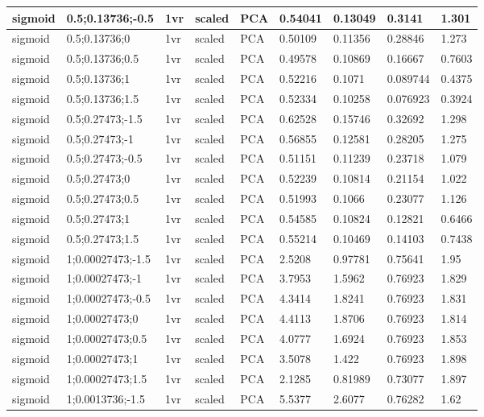 \begin{longtable}{lllllllll}
sigmoid & 0.5;0.13736;-0.5 & 1vr & scaled & PCA & 0.54041 & 0.13049 & 0.3141 & 1.301\\ \hline
sigmoid & 0.5;0.13736;0 & 1vr & scaled & PCA & 0.50109 & 0.11356 & 0.28846 & 1.273\\ \hline
sigmoid & 0.5;0.13736;0.5 & 1vr & scaled & PCA & 0.49578 & 0.10869 & 0.16667 & 0.7603\\ \hline
sigmoid & 0.5;0.13736;1 & 1vr & scaled & PCA & 0.52216 & 0.1071 & 0.089744 & 0.4375\\ \hline
sigmoid & 0.5;0.13736;1.5 & 1vr & scaled & PCA & 0.52334 & 0.10258 & 0.076923 & 0.3924\\ \hline
sigmoid & 0.5;0.27473;-1.5 & 1vr & scaled & PCA & 0.62528 & 0.15746 & 0.32692 & 1.298\\ \hline
sigmoid & 0.5;0.27473;-1 & 1vr & scaled & PCA & 0.56855 & 0.12581 & 0.28205 & 1.275\\ \hline
sigmoid & 0.5;0.27473;-0.5 & 1vr & scaled & PCA & 0.51151 & 0.11239 & 0.23718 & 1.079\\ \hline
sigmoid & 0.5;0.27473;0 & 1vr & scaled & PCA & 0.52239 & 0.10814 & 0.21154 & 1.022\\ \hline
sigmoid & 0.5;0.27473;0.5 & 1vr & scaled & PCA & 0.51993 & 0.1066 & 0.23077 & 1.126\\ \hline
sigmoid & 0.5;0.27473;1 & 1vr & scaled & PCA & 0.54585 & 0.10824 & 0.12821 & 0.6466\\ \hline
sigmoid & 0.5;0.27473;1.5 & 1vr & scaled & PCA & 0.55214 & 0.10469 & 0.14103 & 0.7438\\ \hline
sigmoid & 1;0.00027473;-1.5 & 1vr & scaled & PCA & 2.5208 & 0.97781 & 0.75641 & 1.95\\ \hline
sigmoid & 1;0.00027473;-1 & 1vr & scaled & PCA & 3.7953 & 1.5962 & 0.76923 & 1.829\\ \hline
sigmoid & 1;0.00027473;-0.5 & 1vr & scaled & PCA & 4.3414 & 1.8241 & 0.76923 & 1.831\\ \hline
sigmoid & 1;0.00027473;0 & 1vr & scaled & PCA & 4.4113 & 1.8706 & 0.76923 & 1.814\\ \hline
sigmoid & 1;0.00027473;0.5 & 1vr & scaled & PCA & 4.0777 & 1.6924 & 0.76923 & 1.853\\ \hline
sigmoid & 1;0.00027473;1 & 1vr & scaled & PCA & 3.5078 & 1.422 & 0.76923 & 1.898\\ \hline
sigmoid & 1;0.00027473;1.5 & 1vr & scaled & PCA & 2.1285 & 0.81989 & 0.73077 & 1.897\\ \hline
sigmoid & 1;0.0013736;-1.5 & 1vr & scaled & PCA & 5.5377 & 2.6077 & 0.76282 & 1.62\\ \hline

\end{longtable}
